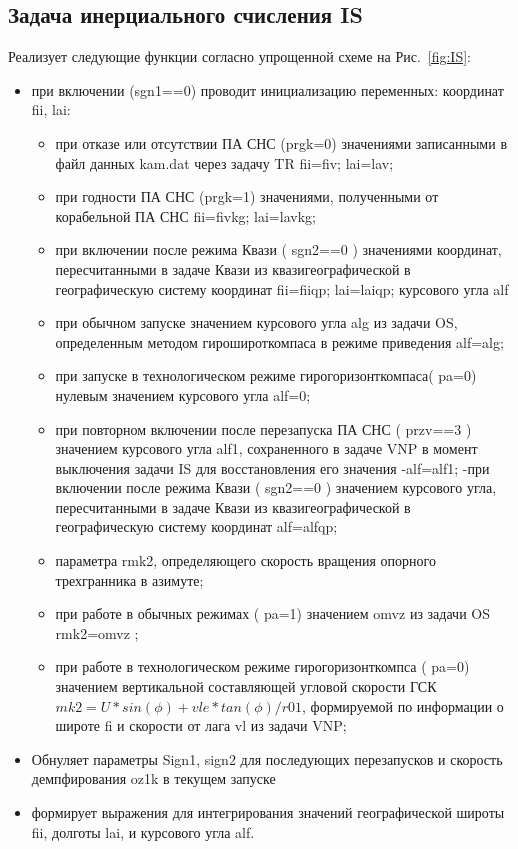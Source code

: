 \subsection{Задача инерциального счисления IS}
Реализует следующие функции согласно упрощенной схеме на Рис.~\ref{fig:IS}:
\begin{itemize}
    \item при включении (sgn1==0) проводит инициализацию переменных:  координат  fii,   lai:
    \begin{itemize}
        \item при отказе или отсутствии ПА СНС (prgk=0) значениями записанными в файл данных  kam.dat через задачу TR   fii=fiv;   lai=lav;
        \item при годности ПА СНС (prgk=1) значениями,  полученными от корабельной ПА СНС    fii=fivkg; lai=lavkg;
        \item при включении после режима Квази ( sgn2==0 ) значениями  координат,  пересчитанными в задаче Квази из квазигеографической в географическую систему координат fii=fiiqp;     lai=laiqp;
курсового угла  alf
        \item при  обычном запуске значением  курсового угла  alg  из задачи OS, определенным методом гирошироткомпаса  в режиме приведения   alf=alg; 
        \item при запуске в технологическом  режиме  гирогоризонткомпаса( pa=0)  нулевым значением  курсового угла  alf=0;
        \item при  повторном включении после перезапуска ПА СНС ( przv==3 ) значением курсового угла  alf1,  сохраненного в задаче VNP 
        в момент выключения задачи  IS для восстановления его значения  -alf=alf1;
        -при включении после режима Квази ( sgn2==0 ) значением  курсового угла,  пересчитанными в задаче Квази из квазигеографической 
        в географическую систему координат alf=alfqp;  
        \item параметра  rmk2,  определяющего скорость вращения опорного трехгранника в азимуте;
        \item при работе в обычных режимах  ( pa=1) значением  omvz  из задачи  OS  rmk2=omvz ;  
        \item при работе в технологическом  режиме  гирогоризонткомпса  ( pa=0) значением  вертикальной составляющей 
        угловой скорости ГСК $mk2=U*sin(\phi)+vle*tan(\phi)/r01$, формируемой по информации о широте fi и скорости от лага vl из задачи VNP;
    \end{itemize}
    \item Обнуляет  параметры  Sign1, sign2  для последующих  перезапусков  и  скорость  демпфирования  oz1k  в текущем запуске 
    \item формирует выражения для  интегрирования значений географической широты  fii, долготы lai,  и курсового угла alf.
\end{itemize}
